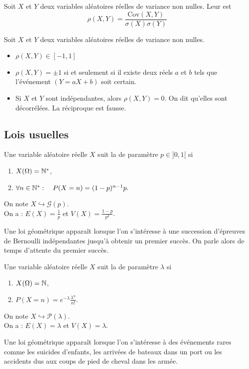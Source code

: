 \documentclass{book}
\begin{document}
\begin{Definition}[Corrélation]

Soit $X$ et $Y$ deux variables aléatoires réelles de variance non nulles.
Leur  est
\[ \rho(X,Y) = \frac{\mathrm{Cov}(X,Y)}{\sigma(X)\sigma(Y)} \]
\end{Definition}


\begin{Proposition}[Propriétés]

Soit $X$ et $Y$ deux variables aléatoires réelles de variance non nulles.
\begin{itemize}
\item
  $\rho(X,Y) \in [-1,1]$
\item
  $\rho(X,Y) = ±1$ si et seulement si il existe deux réels $a$ et $b$ tels que l'événement $(Y=aX+b)$ soit certain.
\item
  Si $X$ et $Y$ sont indépendantes, alors $\rho(X,Y) = 0$. On dit qu'elles sont décorrélées.
  La réciproque est fausse.
\end{itemize}
\end{Proposition}

\subsection{Lois usuelles}

\begin{Definition}

Une variable aléatoire réelle $X$ suit la  de paramètre $p\in]0,1[$
si 
\begin{enumerate}
\item $X(\Omega)=\mathbb{N}^*$,
\item $\forall n \in \mathbb{N}^*:\quad  P(X=n) = (1-p)^{n-1}p.$ 
\end{enumerate} 
On note $X \hookrightarrow \mathcal{G}(p)$.\\
On a : $E(X)=\frac{1}{p}$ et $V(X)=\frac{1-p}{p^2}$.
\end{Definition}
Une loi géométrique apparaît lorsque l'on s'intéresse à une succession d'épreuves de Bernoulli indépendantes jusqu'à obtenir un premier succès. On parle alors de temps d'attente du premier succès.
\begin{Definition}
Une variable aléatoire réelle $X$ suit la  de paramètre $\lambda$
si 
\begin{enumerate}
\item $X(\Omega)=\mathbb{N}$,
\item $P(X=n) = e^{-\lambda}\frac{\lambda^n}{n!}.$ 
\end{enumerate} 
On note $X \hookrightarrow  \mathcal{P}(\lambda)$.\\
On a : $E(X)=\lambda$ et $V(X)=\lambda$.
\end{Definition}
Une loi géométrique apparaît lorsque l'on s'intéresse à des événements rares comme les suicides d'enfants, les arrivées de bateaux dans un port ou les accidents dus aux coups de pied de cheval dans les armée.
\end{document}

